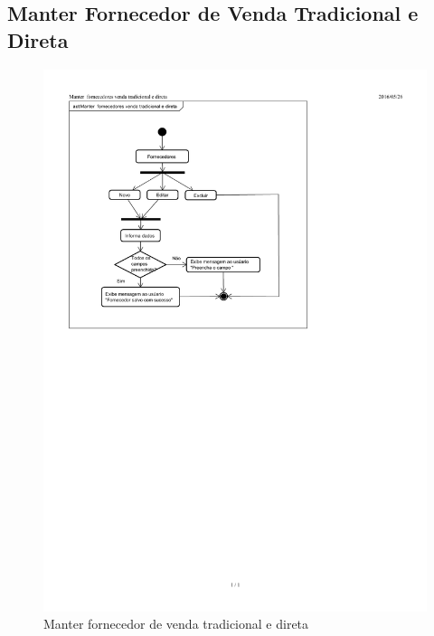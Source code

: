 \documentclass[chapter=TITLE,12pt,oneside,a4paper,english,french,sumario=tradicional,spanish,brazil,]{abntex2}
\begin{document}
\subsection{Manter Fornecedor de Venda Tradicional e Direta}
\begin{figure}[h]\centering
	\includegraphics[scale=1.6]{fornecedor.pdf}\caption{Manter fornecedor de venda tradicional e direta}
\end{figure}


\newpage
\end{document}
